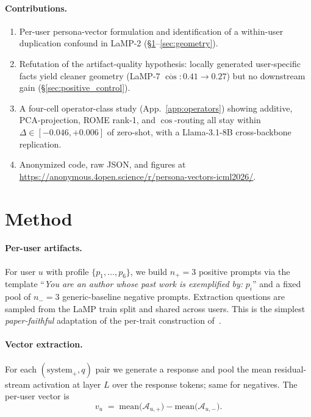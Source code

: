 \documentclass{article}
\begin{document}
\paragraph{Contributions.}
\begin{enumerate}
\item Per-user persona-vector formulation and identification of a
  within-user duplication confound in LaMP-2 (\S\ref{sec:method}--\ref{sec:geometry}).
\item Refutation of the artifact-quality hypothesis: locally generated
  user-specific facts yield cleaner geometry
  (LaMP-7 $\overline{\cos}{:}0.41{\to}0.27$) but no downstream gain
  (\S\ref{sec:positive_control}).
\item A four-cell operator-class study (App.~\ref{app:operators})
  showing additive, PCA-projection, ROME rank-1, and $\cos$-routing
  all stay within $\Delta\!\in\![{-}0.046,{+}0.006]$ of zero-shot,
  with a Llama-3.1-8B cross-backbone replication.
\item Anonymized code, raw JSON, and figures at
  \url{https://anonymous.4open.science/r/persona-vectors-icml2026/}.
\end{enumerate}

\section{Method}
\label{sec:method}

\paragraph{Per-user artifacts.} For user $u$ with profile
$\{p_1,\dots,p_6\}$, we build $n_+{=}3$ positive prompts via the
template ``\emph{You are an author whose past work is exemplified by:}
$p_i$'' and a fixed pool of $n_-{=}3$ generic-baseline negative
prompts. Extraction questions are sampled from the LaMP train split
and shared across users. This is the simplest \emph{paper-faithful}
adaptation of the per-trait construction
of~\citet{chen2025persona}.

\paragraph{Vector extraction.} For each $(\text{system}_+,q)$ pair we
generate a response and pool the mean residual-stream activation at
layer $L$ over the response tokens; same for negatives. The per-user
vector is
\begin{equation}
v_u \;=\; \mathrm{mean}\bigl(\mathcal{A}_{u,+}\bigr)
        - \mathrm{mean}\bigl(\mathcal{A}_{u,-}\bigr).
\label{eq:extraction}
\end{equation}
\end{document}
